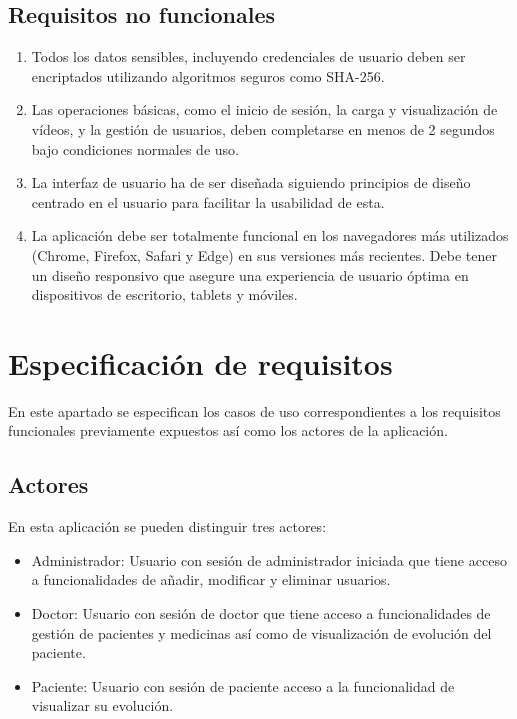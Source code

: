 \subsection{Requisitos no funcionales}
\begin{enumerate}[label=\textbf{RNF\arabic*:}]
    \item Todos los datos sensibles, incluyendo credenciales de usuario deben ser encriptados utilizando algoritmos seguros como SHA-256.
    
     \item Las operaciones básicas, como el inicio de sesión, la carga y visualización de vídeos, y la gestión de usuarios, deben completarse en menos de 2 segundos bajo condiciones normales de uso.

    \item La interfaz de usuario ha de ser diseñada siguiendo principios de diseño centrado en el usuario para facilitar la usabilidad de esta.


    \item La aplicación debe ser totalmente funcional en los navegadores más utilizados (Chrome, Firefox, Safari y Edge) en sus versiones más recientes. Debe tener un diseño responsivo que asegure una experiencia de usuario óptima en dispositivos de escritorio, tablets y móviles.

\end{enumerate}






\section{Especificación de requisitos}

En este apartado se especifican los casos de uso correspondientes  a los requisitos funcionales previamente expuestos así como los actores de la aplicación.
\subsection{Actores}
En esta aplicación se pueden distinguir tres actores:
\begin{itemize}
\item Administrador: Usuario con sesión de administrador iniciada que tiene acceso a funcionalidades de añadir, modificar y eliminar usuarios.
\item Doctor: Usuario con sesión de doctor que tiene acceso a funcionalidades de gestión de pacientes y medicinas así como de visualización de evolución del paciente.
\item Paciente: Usuario con sesión de paciente acceso a la funcionalidad de visualizar su evolución.
\end{itemize}



